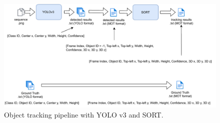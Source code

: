 \begin{figure}[!tb]
  \centering
  \includegraphics[width=1.0\linewidth]{img/YOLOv3+SORT.pdf}
  \caption[Object tracking pipeline with YOLO v3 and SORT]
  {Object tracking pipeline with YOLO v3 and SORT.}
  \label{fig:yolov3+SORT}
\end{figure}